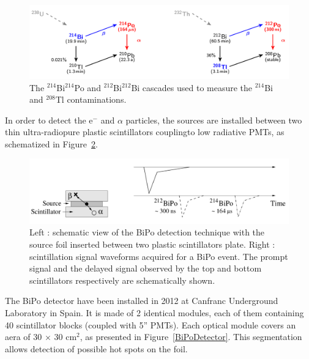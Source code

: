 \documentclass[main.tex]{subfiles}
\begin{document}
\begin{figure}[h!]
\begin{center}
\includegraphics[scale=0.33]{pictures/Chap3/BiPoDecayChain.png}
\caption{The $^{\text{214}}$Bi$^{\text{214}}$Po and $^{\text{212}}$Bi$^{\text{212}}$Bi cascades used to measure the $^{\text{214}}$Bi and $^{\text{208}}$Tl contaminations.}
\label{BiPoDecayChain}
\end{center}
\end{figure}


\NI In order to detect the e$^-$ and $\alpha$ particles, the sources are installed between two thin ultra-radiopure plastic scintillators couplingto low radiative PMTs, as schematized in Figure~\ref{BiPoEvent}. 

\begin{figure}[h!]
\begin{center}
\includegraphics[scale=0.3]{pictures/Chap3/BiPoEvent_2.png}
\caption{Left : schematic view of the BiPo detection technique with the source  foil  inserted  between  two  plastic  scintillators  plate. Right : scintillation signal waveforms acquired for a BiPo event. The prompt signal  and  the  delayed signal observed  by  the  top  and  bottom scintillators respectively are schematically shown.}
\label{BiPoEvent}
\end{center}
\end{figure}


\NI The BiPo detector have been installed in 2012 at Canfranc Underground Laboratory in Spain. It is made of 2 identical modules, each of them containing 40 scintillator blocks (coupled with 5'' PMTs). Each optical module covers an aera of 30 $\times$ 30 cm$^\text{2}$, as presented in Figure~\ref{BiPoDetector}. This segmentation allows detection of possible hot spots on the foil. 
\end{document}
